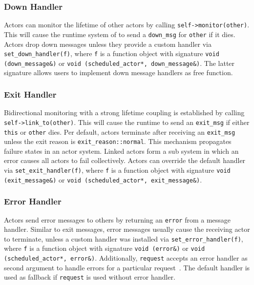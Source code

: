 \subsubsection{Down  Handler}
\label{down-message}

Actors can monitor the lifetime of other actors by calling \lstinline^self->monitor(other)^. This will cause the runtime system of \lib to send a \lstinline^down_msg^ for \lstinline^other^ if it dies. Actors drop down messages unless they provide a custom handler via \lstinline^set_down_handler(f)^, where \lstinline^f^ is a function object with signature \lstinline^void (down_message&)^ or \lstinline^void (scheduled_actor*, down_message&)^. The latter signature allows users to implement down message handlers as free function.

\subsubsection{Exit Handler}
\label{exit-message}

Bidirectional monitoring with a strong lifetime coupling is established by calling \lstinline^self->link_to(other)^. This will cause the runtime to send an \lstinline^exit_msg^ if either \lstinline^this^ or \lstinline^other^ dies. Per default, actors terminate after receiving an \lstinline^exit_msg^ unless the exit reason is \lstinline^exit_reason::normal^. This mechanism propagates failure states in an actor system. Linked actors form a sub system in which an error causes all actors to fail collectively. Actors can override the default handler via \lstinline^set_exit_handler(f)^, where \lstinline^f^ is a function object with signature \lstinline^void (exit_message&)^ or \lstinline^void (scheduled_actor*, exit_message&)^.

\subsubsection{Error Handler}
\label{error-message}

Actors send error messages to others by returning an \lstinline^error^  from a message handler. Similar to exit messages, error messages usually cause the receiving actor to terminate, unless a custom handler was installed via \lstinline^set_error_handler(f)^, where \lstinline^f^ is a function object with signature \lstinline^void (error&)^ or \lstinline^void (scheduled_actor*, error&)^. Additionally, \lstinline^request^ accepts an error handler as second argument to handle errors for a particular request~. The default handler is used as fallback if \lstinline^request^ is used without error handler. 

